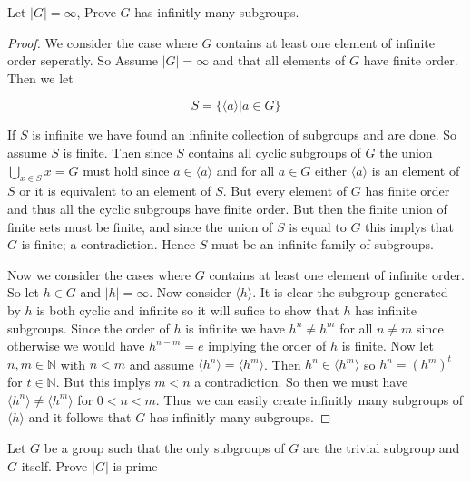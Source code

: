\documentclass[11pt,largemargins]{homework}
\newcommand{\N}{\mathbb{N}}
\begin{document}
\maketitle

\question
Let $|G| = \infty$, Prove $G$ has infinitly many subgroups.

    
\begin{proof}
    We consider the case where $G$ contains at least one element of infinite order seperatly. 
    So Assume $|G| = \infty $ and that all elements of $G$ have finite order. Then we let 

    \[S = \{\langle a \rangle | a \in G\} \] 

    If $S$ is infinite we have found an infinite collection of subgroups and are done. So assume $S$ is finite. Then since $S$ contains 
    all cyclic subgroups of $G$ the union $\bigcup_{x \in S} x = G$ must hold since $a\in \langle a \rangle$ and for all $a \in G$ either $\langle a \rangle$ is 
    an element of $S$ or it is equivalent to an element of $S$. But every element of $G$ has finite order and thus all the cyclic subgroups 
    have finite order. But then the finite union of finite sets must be finite, and since the union of $S$ is equal to $G$ this implys that 
    $G$ is finite; a contradiction. Hence $S$ must be an infinite family of subgroups. 


    Now 
    we consider the cases where $G$ contains at least one element of infinite order. So let $h \in G$ and $|h| = \infty$. Now consider $\langle h \rangle$. It is 
    clear the subgroup generated by $h$ is both cyclic and infinite so it will sufice to show that $h$ has infinite subgroups. Since the order of $h$ 
    is infinite we have $h^n \neq h^m$ for all $n \neq m$ since otherwise we would have $h^{n-m} = e$ implying the order of $h$ is finite.
    Now let $n, m \in \N$ with $n < m$ and assume $\langle h^n \rangle = \langle h^m \rangle$. Then $h^n \in \langle h^m \rangle$ so $h^n = (h^m)^t$ for $t \in \N$. 
    But this implys $m < n$ a contradiction. So then we must have $\langle h^n \rangle \neq \langle h^m \rangle$ for $0 < n < m$. Thus we can easily create infinitly many 
    subgroups of $\langle h \rangle$ and it follows that $G$ has infinitly many subgroups. 
    
\end{proof}

\question
Let $G$ be a group such that the only subgroups of $G$ are the trivial subgroup and $G$ itself. Prove $|G|$ is prime 
\end{document}
